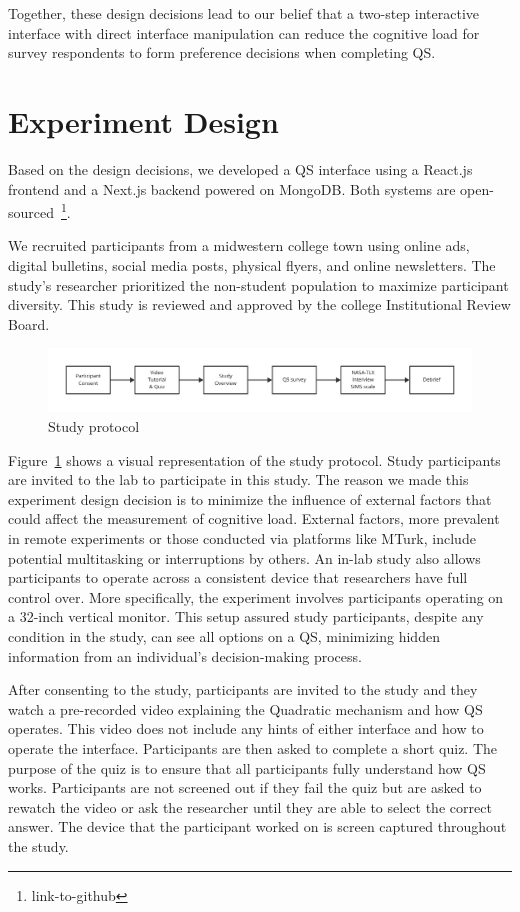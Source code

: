 Together, these design decisions lead to our belief that a two-step interactive interface with direct interface manipulation can reduce the cognitive load for survey respondents to form preference decisions when completing QS.

\section{Experiment Design}
\label{sec:experiment}
Based on the design decisions, we developed a QS interface using a React.js frontend and a Next.js backend powered on MongoDB. Both systems are open-sourced~\footnote{link-to-github}.

We recruited participants from a midwestern college town using online ads, digital bulletins, social media posts, physical flyers, and online newsletters. The study's researcher prioritized the non-student population to maximize participant diversity. This study is reviewed and approved by the college Institutional Review Board.

\begin{figure}[h]
    \centering
    \includegraphics[width=1\textwidth]{content/image/study_flow.pdf}
    \caption{Study protocol}
    \label{fig:studyProtocol}
\end{figure}

Figure~\ref{fig:studyProtocol} shows a visual representation of the study protocol. Study participants are invited to the lab to participate in this study. The reason we made this experiment design decision is to minimize the influence of external factors that could affect the measurement of cognitive load. External factors, more prevalent in remote experiments or those conducted via platforms like MTurk, include potential multitasking or interruptions by others. An in-lab study also allows participants to operate across a consistent device that researchers have full control over. More specifically, the experiment involves participants operating on a 32-inch vertical monitor. This setup assured study participants, despite any condition in the study, can see all options on a QS, minimizing hidden information from an individual's decision-making process.

After consenting to the study, participants are invited to the study and they watch a pre-recorded video explaining the Quadratic mechanism and how QS operates. This video does not include any hints of either interface and how to operate the interface. Participants are then asked to complete a short quiz. The purpose of the quiz is to ensure that all participants fully understand how QS works. Participants are not screened out if they fail the quiz but are asked to rewatch the video or ask the researcher until they are able to select the correct answer. The device that the participant worked on is screen captured throughout the study.

